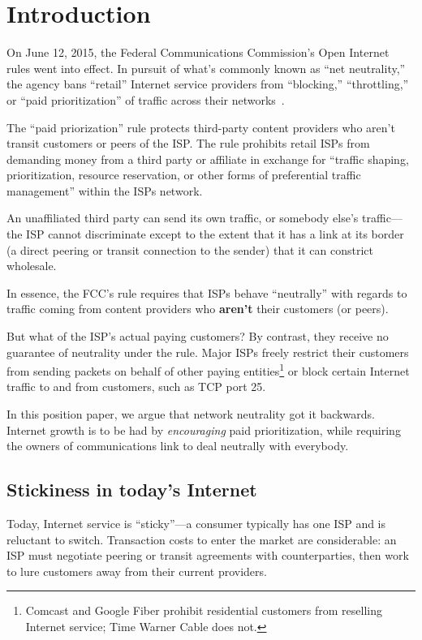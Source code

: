 \section{Introduction}

\label{sec:intro}

On June 12, 2015, the Federal Communications Commission's Open
Internet rules went into effect. In pursuit of what's commonly known
as ``net neutrality,'' the agency bans ``retail'' Internet service
providers from ``blocking,'' ``throttling,'' or ``paid
prioritization'' of traffic across their networks~\cite{openinternet}.

The ``paid priorization'' rule protects third-party
content providers who aren't transit customers or peers of the
ISP. The rule prohibits retail ISPs from demanding money from a third
party or affiliate in exchange for ``traffic shaping, prioritization,
resource reservation, or other forms of preferential traffic
management'' within the ISPs network.

An unaffiliated third party can send its own traffic, or somebody
else's traffic---the ISP cannot discriminate except to the extent that
it has a link at its border (a direct peering or transit connection to
the sender) that it can constrict wholesale.

In essence, the FCC's rule requires that ISPs behave ``neutrally''
with regards to traffic coming from content providers who
\textbf{aren't} their customers (or peers).

But what of the ISP's actual paying customers? By contrast, they
receive no guarantee of neutrality under the rule. Major ISPs freely
restrict their customers from sending packets on behalf of other
paying entities\footnote{Comcast and Google Fiber prohibit residential
  customers from reselling Internet service; Time Warner Cable does
  not.} or block certain Internet traffic to and from
customers, such as TCP port 25.

In this position paper, we argue that network neutrality got it
backwards. Internet growth is to be had by \emph{encouraging} paid
prioritization, while requiring the owners of communications link to
deal neutrally with everybody.

\subsection{Stickiness in today's Internet}

Today, Internet service is ``sticky''---a consumer typically has one
ISP and is reluctant to switch. Transaction costs to enter the market
are considerable: an ISP must negotiate peering or transit agreements
with counterparties, then work to lure customers away from
their current providers.

